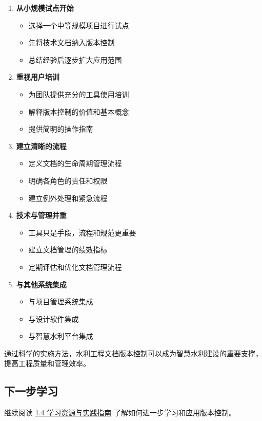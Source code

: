 \begin{enumerate}
\def\labelenumi{\arabic{enumi}.}
\tightlist
\item
  \textbf{从小规模试点开始}

  \begin{itemize}
  \tightlist
  \item
    选择一个中等规模项目进行试点
  \item
    先将技术文档纳入版本控制
  \item
    总结经验后逐步扩大应用范围
  \end{itemize}
\item
  \textbf{重视用户培训}

  \begin{itemize}
  \tightlist
  \item
    为团队提供充分的工具使用培训
  \item
    解释版本控制的价值和基本概念
  \item
    提供简明的操作指南
  \end{itemize}
\item
  \textbf{建立清晰的流程}

  \begin{itemize}
  \tightlist
  \item
    定义文档的生命周期管理流程
  \item
    明确各角色的责任和权限
  \item
    建立例外处理和紧急流程
  \end{itemize}
\item
  \textbf{技术与管理并重}

  \begin{itemize}
  \tightlist
  \item
    工具只是手段，流程和规范更重要
  \item
    建立文档管理的绩效指标
  \item
    定期评估和优化文档管理流程
  \end{itemize}
\item
  \textbf{与其他系统集成}

  \begin{itemize}
  \tightlist
  \item
    与项目管理系统集成
  \item
    与设计软件集成
  \item
    与智慧水利平台集成
  \end{itemize}
\end{enumerate}

通过科学的实施方法，水利工程文档版本控制可以成为智慧水利建设的重要支撑，提高工程质量和管理效率。

\subsection{下一步学习}\label{ux4e0bux4e00ux6b65ux5b66ux4e60}

继续阅读 \href{section03-01-04.md}{1.4 学习资源与实践指南}
了解如何进一步学习和应用版本控制。
